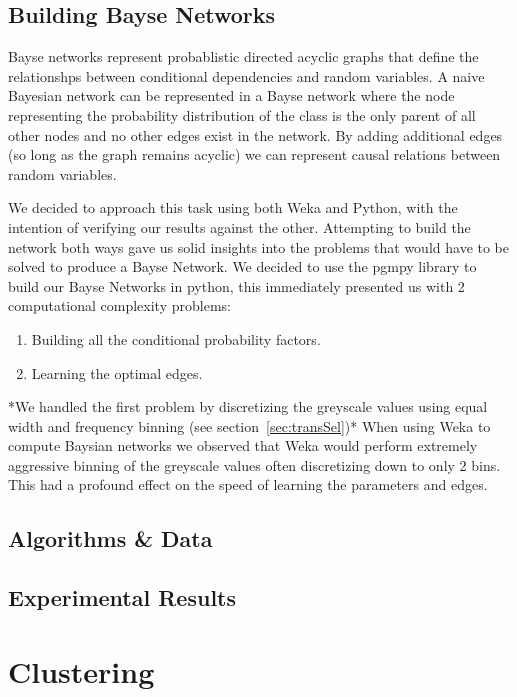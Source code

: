\documentclass[11pt]{article}
\begin{document}
\subsection{Building Bayse Networks}
Bayse networks represent probablistic directed acyclic graphs that define the relationshps between conditional dependencies and random variables.
A naive Bayesian network can be represented in a Bayse network where the node representing the probability distribution of the class is the only parent of all other nodes and no other edges exist in the network. 
By adding additional edges (so long as the graph remains acyclic) we can represent causal relations between random variables.
\par
We decided to approach this task using both Weka and Python, with the intention of verifying our results against the other.
Attempting to build the network both ways gave us solid insights into the problems that would have to be solved to produce a Bayse Network.
We decided to use the pgmpy library to build our Bayse Networks in python, this immediately presented us with 2 computational complexity problems:
\begin{enumerate}
    \item Building all the conditional probability factors.
    \item Learning the optimal edges.
\end{enumerate}

*We handled the first problem by discretizing the greyscale values using equal width and frequency binning (see section~\ref{sec:transSel})*
When using Weka to compute Baysian networks we observed that Weka would perform extremely aggressive binning of the greyscale values often discretizing down to only 2 bins. This had a profound effect on the speed of learning the parameters and edges.

\subsection{Algorithms \& Data}


\subsection{Experimental Results}


\pagebreak

\section{Clustering}
\end{document}
